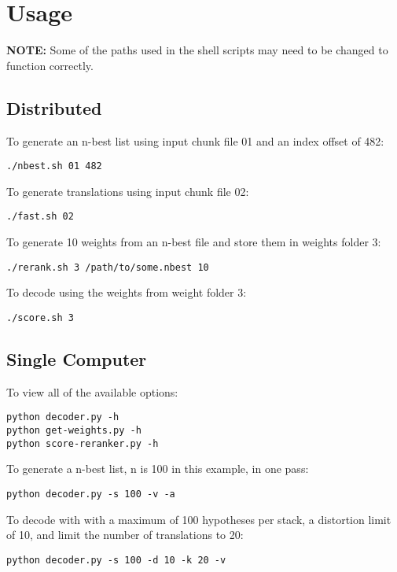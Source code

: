 \documentclass[letterpaper]{article}
\begin{document}
\section{Usage}

\textbf{NOTE:} Some of the paths used in the shell scripts may need to be changed to function correctly.

\subsection{Distributed}

To generate an n-best list using input chunk file 01 and an index offset of 482:
\begin{lstlisting}[frame=single]
./nbest.sh 01 482
\end{lstlisting}

\noindent To generate translations using input chunk file 02:
\begin{lstlisting}[frame=single]
./fast.sh 02
\end{lstlisting}

\noindent To generate 10 weights from an n-best file and store them in weights folder 3:
\begin{lstlisting}[frame=single]
./rerank.sh 3 /path/to/some.nbest 10
\end{lstlisting}

\noindent To decode using the weights from weight folder 3:
\begin{lstlisting}[frame=single]
./score.sh 3
\end{lstlisting}

\subsection{Single Computer}

To view all of the available options:
\begin{lstlisting}[frame=single]
python decoder.py -h
python get-weights.py -h
python score-reranker.py -h
\end{lstlisting}

\noindent To generate a n-best list, n is 100 in this example, in one pass:
\begin{lstlisting}[frame=single]
python decoder.py -s 100 -v -a
\end{lstlisting}

\noindent To decode with with a maximum of 100 hypotheses per stack, a distortion limit of 10, and limit the number of translations to 20:
\begin{lstlisting}[frame=single]
python decoder.py -s 100 -d 10 -k 20 -v
\end{lstlisting}
\end{document}
